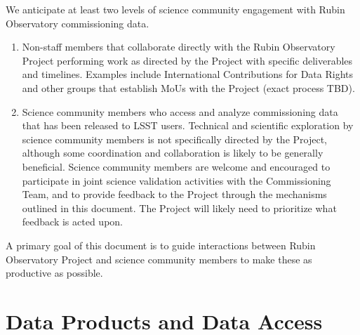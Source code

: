 \documentclass[SE,authoryear,toc]{lsstdoc}
\begin{document}
We anticipate at least two levels of science community engagement with Rubin Observatory commissioning data. 

\begin{enumerate}

\item Non-staff members that collaborate directly with the Rubin Observatory Project performing work as directed by the Project with specific deliverables and timelines. 
Examples include International Contributions for Data Rights and other groups that establish MoUs with the Project (exact process TBD).

\item Science community members who access and analyze commissioning data that has been released to LSST users.
Technical and scientific exploration by science community members is not specifically directed by the Project, although some coordination and collaboration is likely to be generally beneficial.
Science community members are welcome and encouraged to participate in joint science validation activities with the Commissioning Team, and to provide feedback to the Project through the mechanisms outlined in this document.
The Project will likely need to prioritize what feedback is acted upon.

\end{enumerate}

A primary goal of this document is to guide interactions between Rubin Observatory Project and science community members to make these as productive as possible.

\section{Data Products and Data Access}
\end{document}
